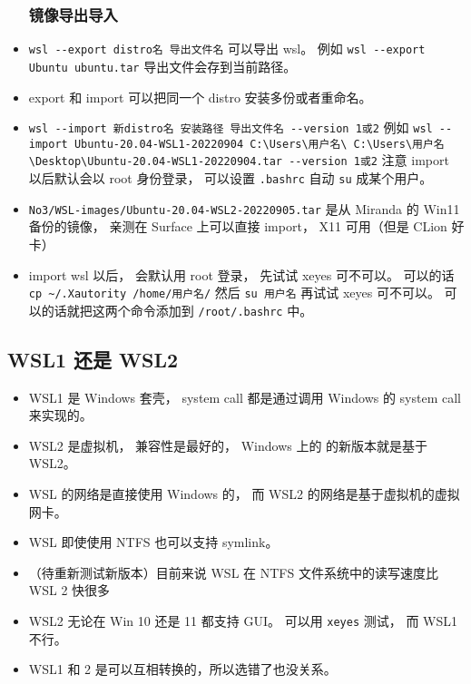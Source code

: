 \begin{itemize}
\subsubsection{镜像导出导入}
\item \verb`wsl --export distro名 导出文件名` 可以导出 wsl。 例如 \verb`wsl --export Ubuntu ubuntu.tar` 导出文件会存到当前路径。
\item export 和 import 可以把同一个 distro 安装多份或者重命名。
\item \verb`wsl --import 新distro名 安装路径 导出文件名 --version 1或2` 例如 \verb`wsl --import Ubuntu-20.04-WSL1-20220904 C:\Users\用户名\ C:\Users\用户名\Desktop\Ubuntu-20.04-WSL1-20220904.tar --version 1或2` 注意 import 以后默认会以 root 身份登录， 可以设置 \verb`.bashrc` 自动 \verb`su` 成某个用户。
\item \verb`No3/WSL-images/Ubuntu-20.04-WSL2-20220905.tar` 是从 Miranda 的 Win11 备份的镜像， 亲测在 Surface 上可以直接 import， X11 可用（但是 CLion 好卡）
\item import wsl 以后， 会默认用 root 登录， 先试试 xeyes 可不可以。 可以的话 \verb`cp ~/.Xautority /home/用户名/` 然后 \verb`su 用户名` 再试试 xeyes 可不可以。 可以的话就把这两个命令添加到 \verb`/root/.bashrc` 中。
\end{itemize}

\subsection{WSL1 还是 WSL2}
\begin{itemize}
\item WSL1 是 Windows 套壳， system call 都是通过调用 Windows 的 system call 来实现的。
\item WSL2 是虚拟机， 兼容性是最好的， Windows 上的  的新版本就是基于 WSL2。
\item WSL 的网络是直接使用 Windows 的， 而 WSL2 的网络是基于虚拟机的虚拟网卡。
\item WSL 即使使用 NTFS 也可以支持 symlink。
\item （待重新测试新版本）目前来说 WSL 在 NTFS 文件系统中的读写速度比 WSL 2 快很多
\item WSL2 无论在 Win 10 还是 11 都支持 GUI。 可以用 \verb|xeyes| 测试， 而 WSL1 不行。
\item WSL1 和 2 是可以互相转换的，所以选错了也没关系。
\end{itemize}

